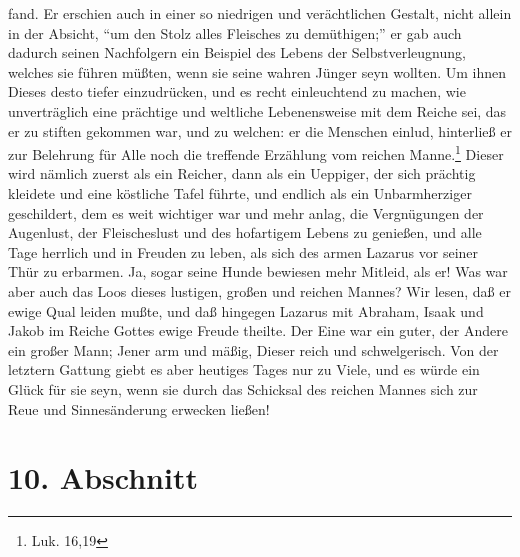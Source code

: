 fand. Er erschien auch in einer so niedrigen und verächtlichen Gestalt, nicht
allein in der Absicht, "`um den Stolz alles Fleisches zu demüthigen;"' er gab
auch dadurch seinen Nachfolgern ein Beispiel des Lebens der Selbstverleugnung,
welches sie führen müßten, wenn sie seine wahren Jünger seyn wollten. Um ihnen
Dieses desto tiefer einzudrücken, und es recht einleuchtend zu machen, wie
unverträglich eine prächtige und weltliche Lebenensweise mit dem Reiche sei, das
er zu stiften gekommen war, und zu welchen: er die Menschen einlud, hinterließ
er zur Belehrung für Alle noch die treffende Erzählung vom reichen
Manne.\footnote{Luk. 16,19} Dieser wird nämlich zuerst als ein Reicher, dann als
ein Ueppiger, der sich prächtig kleidete und eine köstliche Tafel führte, und
endlich als ein Unbarmherziger geschildert, dem es weit wichtiger war und mehr
anlag, die Vergnügungen der Augenlust, der Fleischeslust und des hofartigem
Lebens zu genießen, und alle Tage herrlich und in Freuden zu leben, als sich des
armen Lazarus vor seiner Thür zu erbarmen. Ja, sogar seine Hunde bewiesen mehr
Mitleid, als er! Was war aber auch das Loos dieses lustigen, großen und reichen
Mannes? Wir lesen, daß er ewige Qual leiden mußte, und daß hingegen Lazarus mit
Abraham, Isaak und Jakob im Reiche Gottes ewige Freude theilte. Der Eine war ein
guter, der Andere ein großer Mann; Jener arm und mäßig, Dieser reich und
schwelgerisch. Von der letztern Gattung giebt es aber heutiges Tages nur zu
Viele, und es würde ein Glück für sie seyn, wenn sie durch das Schicksal des
reichen Mannes sich zur Reue und Sinnesänderung erwecken ließen!

\section{10. Abschnitt} \label{kap14_ab10}

